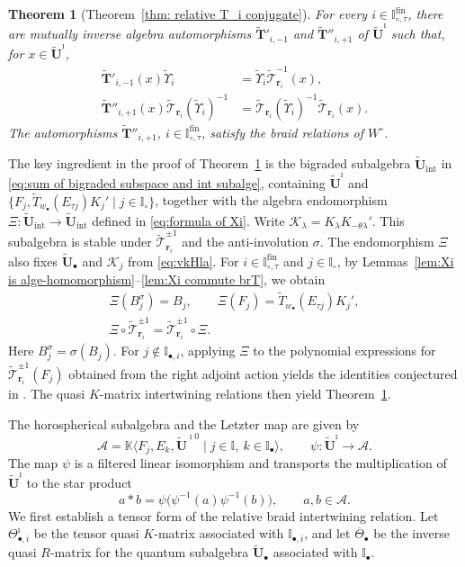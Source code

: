 \documentclass[a4paper,reqno,12pt]{amsart}
\numberwithin{equation}{section}
\theoremstyle{definition}
\theoremstyle{plain}
\newtheorem{introtheorem}{Theorem}
\theoremstyle{definition}
\def\K{\mathbb K}
\def\I{\mathbb I}
\def\bI{\I_\bullet}
\def\wI{\I_\circ}
\def\bIi{\I_{\bullet,i}}
\def\bw{w_\bullet}
\def\br{\mathbf r}
\def\tU{\widetilde{\mathbf U}}
\def\tUi{\widetilde{\mathbf U}^{\imath}}
\def \tbU{\tU_{\bullet}}
\def\tTD{\widetilde T}
\def\tT{\widetilde{\mathscr T}}
\def\tTT{\widetilde{\mathbf T}}
\def\tfX{\widetilde\Upsilon}
\def\cA{\mathcal A}
\def\cK{\mathcal K}
\def \wItau{\I_{\circ,\tau}}
\def \fwItau{\wItau^{\mathrm{fin}}}
\begin{document}
\begin{introtheorem}[Theorem~\ref{thm: relative T_i conjugate}]
\label{thm:intro-existence}
For every $i\in\fwItau$, there are mutually inverse algebra
automorphisms $\tTT'_{i,-1}$ and $\tTT''_{i,+1}$ of $\tUi$ such that,
for $x\in\tUi$,
\begin{align*}
  \tTT'_{i,-1}(x)\tfX_i
    &=\tfX_i\tT_{\br_i}^{-1}(x),\\
  \tTT''_{i,+1}(x)\tT_{\br_i}(\tfX_i)^{-1}
    &=\tT_{\br_i}(\tfX_i)^{-1}\tT_{\br_i}(x).
\end{align*}
The automorphisms $\tTT''_{i,+1}$, $i\in\fwItau$, satisfy the braid
relations of $W^\circ$.
\end{introtheorem}
The key ingredient in the proof of Theorem~\ref{thm:intro-existence}
is the bigraded subalgebra $\tU_{\text{int}}$ in
\eqref{eq:sum of bigraded subspace and int subalge}, containing
$\tUi$ and $\{F_j,\tTD_{\bw}(E_{\tau j})K_j'\mid j\in\wI\}$, together with the algebra endomorphism
$\Xi:\tU_{\text{int}}\longrightarrow\tU_{\text{int}}$ defined in
\eqref{eq:formula of Xi}. Write $\cK_\lambda=K_\lambda K_{-\theta\lambda}'$. 
This subalgebra is stable under $\tT_{\br_i}^{\pm1}$ and the anti-involution $\sigma$. The endomorphism $\Xi$ also fixes $\tbU$ and $\cK_j$ from \eqref{eq:vkHla}.
For $i\in\fwItau$ and $j\in\wI$, by Lemmas~\ref{lem:Xi is alge-homomorphism}--\ref{lem:Xi commute brT}, we obtain
\begin{gather*}
  \Xi(B_j^\sigma)=B_j,\qquad
  \Xi(F_j)=\tTD_{\bw}(E_{\tau j})K_j',\\
  \Xi\circ\tT_{\br_i}^{\pm1}
    =\tT_{\br_i}^{\pm1}\circ\Xi.
\end{gather*}
Here $B_j^\sigma=\sigma(B_j)$.
For $j\notin\bIi$, applying $\Xi$ to the polynomial expressions
for $\tT_{\br_i}^{\pm1}(F_j)$ obtained from the right adjoint action
yields the identities conjectured in
\cite[Conjecture~5.13]{WZ23}.
The quasi $K$-matrix intertwining relations then yield
Theorem~\ref{thm:intro-existence}.


The horospherical subalgebra and the Letzter map are given by
\[
  \cA=\K\langle F_j,E_k,\tU^{\imath 0}
           \mid j\in\I,\ k\in\bI\rangle,
  \qquad
  \psi:\tUi\longrightarrow\cA.
\]
The map $\psi$ is a filtered linear isomorphism and transports the
multiplication of $\tUi$ to the star product
\[
  a\ast b=\psi\bigl(\psi^{-1}(a)\psi^{-1}(b)\bigr),
  \qquad a,b\in\cA.
\]
We first establish a tensor form of the relative braid intertwining
relation. Let $\Theta_{\bullet,i}^{\imath}$ be the tensor quasi
$K$-matrix associated with $\bIi$, and let $\overline\Theta_\bullet$
be the inverse quasi $R$-matrix for the quantum subalgebra $\tbU$
associated with $\bI$.
\end{document}

